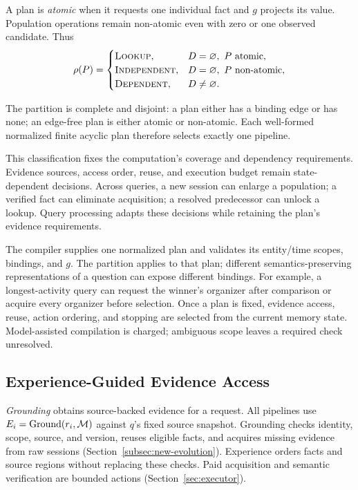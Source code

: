 A plan is \emph{atomic} when it requests one individual fact and $g$
projects its value. Population operations remain non-atomic even with
zero or one observed candidate. Thus
\begin{equation}
\label{eq:planner}
\rho(P)=
\begin{cases}
\textsc{Lookup}, &D=\varnothing,\ P\text{ atomic},\\
\textsc{Independent}, &D=\varnothing,\ P\text{ non-atomic},\\
\textsc{Dependent},&D\neq\varnothing.
\end{cases}
\end{equation}

The partition is complete and disjoint: a plan either has a binding
edge or has none; an edge-free plan is either atomic or non-atomic.
Each well-formed normalized finite acyclic plan therefore selects
exactly one pipeline.

This classification fixes the computation's coverage and dependency
requirements. Evidence sources, access order, reuse, and execution
budget remain state-dependent decisions. Across queries, a new session can enlarge a
population; a verified fact can eliminate acquisition; a resolved
predecessor can unlock a lookup. Query processing adapts these decisions
while retaining the plan's evidence requirements.

The compiler supplies one normalized plan and validates its entity/time
scopes, bindings, and $g$. The partition applies to that plan; different
semantics-preserving representations of a question can expose different
bindings. For example, a longest-activity query can request the winner's
organizer after comparison or acquire every organizer before selection.
Once a plan is fixed, evidence access, reuse, action ordering, and
stopping are selected from the current memory state. Model-assisted
compilation is charged; ambiguous scope leaves a required check unresolved.

\subsection{Experience-Guided Evidence Access}
\label{subsec:new-experience}

\emph{Grounding} obtains source-backed evidence for a request.
All pipelines use $E_i=\operatorname{Ground}(r_i,\mathcal{M})$ against $q$'s
fixed source snapshot. Grounding checks identity, scope, source, and
version, reuses eligible facts, and acquires missing evidence from raw
sessions (Section~\ref{subsec:new-evolution}). Experience orders facts
and source regions without replacing these checks. Paid acquisition and
semantic verification are bounded actions (Section~\ref{sec:executor}).

